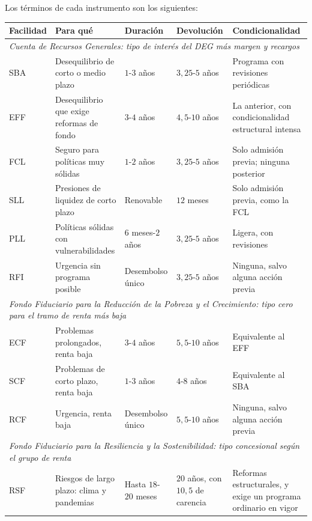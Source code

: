 \documentclass[10pt,a4paper]{article}
\begin{document}
Los términos de cada instrumento son los siguientes:

\begin{center}
{\footnotesize
\begin{tabular}{|p{1.6cm}|p{3.5cm}|p{1.8cm}|p{2.0cm}|p{3.6cm}|}
\hline
\textbf{Facilidad} & \textbf{Para qué} & \textbf{Duración} & \textbf{Devolución} & \textbf{Condicionalidad} \\
\hline
\multicolumn{5}{|l|}{\textit{Cuenta de Recursos Generales: tipo de interés del DEG más margen y recargos}} \\
\hline
SBA & Desequilibrio de corto o medio plazo & $1$-$3$ años & $3{,}25$-$5$ años & Programa con revisiones periódicas \\
\hline
EFF & Desequilibrio que exige reformas de fondo & $3$-$4$ años & $4{,}5$-$10$ años & La anterior, con condicionalidad estructural intensa \\
\hline
FCL & Seguro para políticas muy sólidas & $1$-$2$ años & $3{,}25$-$5$ años & Solo admisión previa; ninguna posterior \\
\hline
SLL & Presiones de liquidez de corto plazo & Renovable & $12$ meses & Solo admisión previa, como la FCL \\
\hline
PLL & Políticas sólidas con vulnerabilidades & $6$ meses-$2$ años & $3{,}25$-$5$ años & Ligera, con revisiones \\
\hline
RFI & Urgencia sin programa posible & Desembolso único & $3{,}25$-$5$ años & Ninguna, salvo alguna acción previa \\
\hline
\multicolumn{5}{|l|}{\textit{Fondo Fiduciario para la Reducción de la Pobreza y el Crecimiento: tipo cero para el tramo de renta más baja}} \\
\hline
ECF & Problemas prolongados, renta baja & $3$-$4$ años & $5{,}5$-$10$ años & Equivalente al EFF \\
\hline
SCF & Problemas de corto plazo, renta baja & $1$-$3$ años & $4$-$8$ años & Equivalente al SBA \\
\hline
RCF & Urgencia, renta baja & Desembolso único & $5{,}5$-$10$ años & Ninguna, salvo alguna acción previa \\
\hline
\multicolumn{5}{|l|}{\textit{Fondo Fiduciario para la Resiliencia y la Sostenibilidad: tipo concesional según el grupo de renta}} \\
\hline
RSF & Riesgos de largo plazo: clima y pandemias & Hasta $18$-$20$ meses & $20$ años, con $10{,}5$ de carencia & Reformas estructurales, y exige un programa ordinario en vigor \\
\hline
\end{tabular}}
\end{center}
\end{document}
